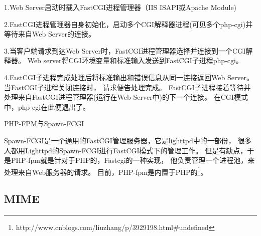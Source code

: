 \documentclass{book}
\begin{document}
1.Web Server启动时载入FastCGI进程管理器（IIS ISAPI或Apache Module)

2.FastCGI进程管理器自身初始化，启动多个CGI解释器进程(可见多个php-cgi)并等待来自Web Server的连接。

3.当客户端请求到达Web Server时，FastCGI进程管理器选择并连接到一个CGI解释器。
Web server将CGI环境变量和标准输入发送到FastCGI子进程php-cgi。

4.FastCGI子进程完成处理后将标准输出和错误信息从同一连接返回Web Server。
当FastCGI子进程关闭连接时， 请求便告处理完成。
FastCGI子进程接着等待并处理来自FastCGI进程管理器(运行在Web Server中)的下一个连接。 
在CGI模式中，php-cgi在此便退出了。

PHP-FPM与Spawn-FCGI

Spawn-FCGI是一个通用的FastCGI管理服务器，它是lighttpd中的一部份，
很多人都用Lighttpd的Spawn-FCGI进行FastCGI模式下的管理工作。
但是有缺点，于是PHP-fpm就是针对于PHP的，Fastcgi的一种实现，
他负责管理一个进程池，来处理来自Web服务器的请求。
目前，PHP-fpm是内置于PHP的\footnote{http://www.cnblogs.com/liuzhang/p/3929198.html\#undefined}。

\subsection{MIME}
\end{document}
